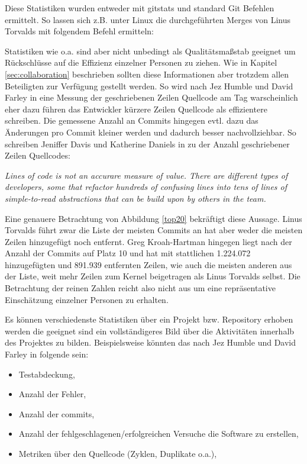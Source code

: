 Diese Statistiken wurden entweder mit gitstats\cite{link:gitstats} und standard
Git Befehlen ermittelt. So lassen sich z.B. unter Linux die durchgeführten
Merges von Linus Torvalds mit folgendem Befehl ermitteln:



Statistiken wie o.a. sind aber nicht unbedingt als Qualitätsmaßstab geeignet um
Rückschlüsse auf die Effizienz einzelner Personen zu ziehen.  Wie in Kapitel
\ref{sec:collaboration} beschrieben sollten diese Informationen aber trotzdem
allen Beteiligten zur Verfügung gestellt werden.  So wird nach Jez Humble und
David Farley in \cite[S.~138]{cd} eine Messung der geschriebenen Zeilen
Quellcode am Tag warscheinlich eher dazu führen das Entwickler kürzere Zeilen
Quellcode als effizientere schreiben. Die gemessene Anzahl an Commits hingegen
evtl. dazu das Änderungen pro Commit kleiner werden und dadurch besser
nachvollziehbar. So schreiben Jeniffer Davis und Katherine Daniels in
\cite[S.~179]{effdo} zu der Anzahl geschriebener Zeilen Quellcodes:
\begin{center}
\textit{\glqq{}Lines of code is not an accurare measure of value. There are
different types of developers, some that refactor hundreds of confusing lines
into tens of lines of simple-to-read abstractions that can be build upon by
others in the team.\grqq{}}
\end{center}

Eine genauere Betrachtung von Abbildung \ref{top20} bekräftigt diese Aussage.
Linus Torvalds führt zwar die Liste der meisten Commits an hat aber weder die
meisten Zeilen hinzugefügt noch entfernt. Greg Kroah-Hartman hingegen liegt
nach der Anzahl der Commits auf Platz 10 und hat mit stattlichen 1.224.072
hinzugefügten und 891.939 entfernten Zeilen, wie auch die meisten anderen aus
der Liste, weit mehr Zeilen zum Kernel beigetragen als Linus Torvalds selbst.
Die Betrachtung der reinen Zahlen reicht also nicht aus um eine repräsentative 
Einschätzung einzelner Personen zu erhalten.

Es können verschiedenste Statistiken über ein Projekt bzw. Repository erhoben
werden die geeignet sind ein vollständigeres Bild über die Aktivitäten
innerhalb des Projektes zu bilden. Beispielsweise könnten das nach Jez Humble
und David Farley in \cite[S.~138]{cd}folgende sein:

\begin{itemize}
\item Testabdeckung,
\item Anzahl der Fehler,
\item Anzahl der \glspl{commit},
\item Anzahl der fehlgeschlagenen/erfolgreichen Versuche die Software zu erstellen,
\item Metriken über den Quellcode (Zyklen, Duplikate o.a.),
\end{itemize}


